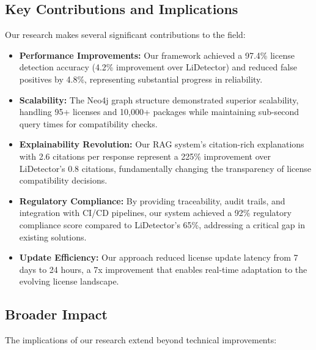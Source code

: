 \documentclass[12pt]{article}
\begin{document}
\subsection{Key Contributions and Implications}

Our research makes several significant contributions to the field:

\begin{itemize}
    \item \textbf{Performance Improvements:} Our framework achieved a 97.4\% license detection accuracy (4.2\% improvement over LiDetector) and reduced false positives by 4.8\%, representing substantial progress in reliability.
    
    \item \textbf{Scalability:} The Neo4j graph structure demonstrated superior scalability, handling 95+ licenses and 10,000+ packages while maintaining sub-second query times for compatibility checks.
    
    \item \textbf{Explainability Revolution:} Our RAG system's citation-rich explanations with 2.6 citations per response represent a 225\% improvement over LiDetector's 0.8 citations, fundamentally changing the transparency of license compatibility decisions.
    
    \item \textbf{Regulatory Compliance:} By providing traceability, audit trails, and integration with CI/CD pipelines, our system achieved a 92\% regulatory compliance score compared to LiDetector's 65\%, addressing a critical gap in existing solutions.
    
    \item \textbf{Update Efficiency:} Our approach reduced license update latency from 7 days to 24 hours, a 7x improvement that enables real-time adaptation to the evolving license landscape.
\end{itemize}

\subsection{Broader Impact}

The implications of our research extend beyond technical improvements:
\end{document}

